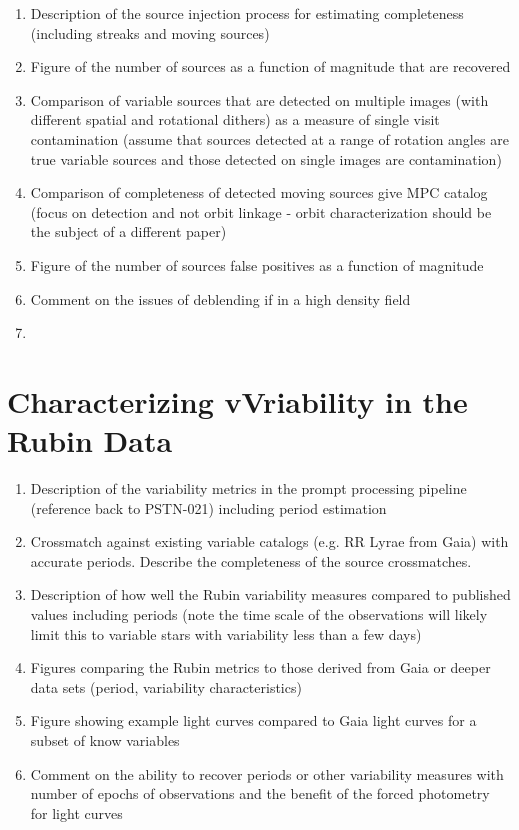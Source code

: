 \begin{enumerate}

    \item Description of the source injection process for estimating completeness (including streaks and moving sources)
    \item Figure of the number of sources as a function of magnitude that are recovered
    \item Comparison of variable sources that are detected on multiple images (with different spatial and rotational dithers) as a measure of single
    visit contamination (assume that sources detected at a range of rotation angles are true variable sources and those detected on single images are 
    contamination)
    \item Comparison of completeness of detected moving sources give MPC catalog (focus on detection and not orbit linkage - orbit characterization should be the subject of a different paper)
    \item Figure of the number of sources false positives as a function of magnitude
    \item Comment on the issues of deblending if in a high density field
    \item 
\end{enumerate}

\section{Characterizing vVriability in the Rubin Data}

\begin{enumerate}

    \item Description of the variability metrics in the prompt processing pipeline (reference back to PSTN-021) including period estimation
    \item Crossmatch against existing variable catalogs (e.g. RR Lyrae from Gaia) with accurate periods. Describe the completeness of the 
    source crossmatches. 
    \item Description of how well the Rubin variability measures compared to published values including periods (note the time scale of the observations
    will likely limit this to variable stars with variability less than a few days)
    \item Figures comparing the Rubin metrics to those derived from Gaia or deeper data sets (period, variability characteristics)
    \item Figure showing example light curves compared to Gaia light curves for a subset of know variables
    \item Comment on the ability to recover periods or other variability measures with number of epochs of observations and the benefit of the 
    forced photometry for light curves

\end{enumerate}

